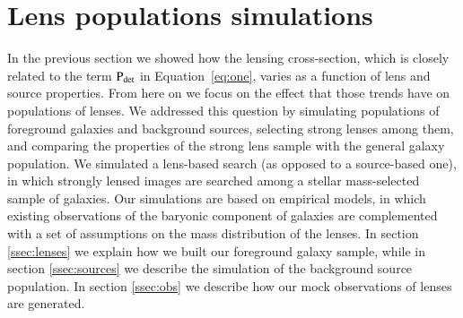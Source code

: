 \documentclass{aa}
\def\pdet{{\rm P}_\mathrm{det}}
\def\Sref#1{Section~\ref{#1}\xspace}
\def\Fref#1{Figure~\ref{#1}\xspace}
\def\Eref#1{Equation~\ref{#1}\xspace}
\begin{document}





\section{Lens populations simulations}\label{sect:lenspop}

In the previous section we showed how the lensing cross-section, which is closely related to the term $\pdet$ in \Eref{eq:one}, varies as a function of lens and source properties.
From here on we focus on the effect that those trends have on populations of lenses.
We addressed this question by simulating populations of foreground galaxies and background sources, selecting strong lenses among them, and comparing the properties of the strong lens sample with the general galaxy population.
We simulated a lens-based search (as opposed to a source-based one), in which strongly lensed images are searched among a stellar mass-selected sample of galaxies.
Our simulations are based on empirical models, in which existing observations of the baryonic component of galaxies are complemented with a set of assumptions on the mass distribution of the lenses.
In section \ref{ssec:lenses} we explain how we built our foreground galaxy sample,
while in section \ref{ssec:sources} we describe the simulation of the background source population.
In section \ref{ssec:obs} we describe how our mock observations of lenses are generated.

\end{document}
